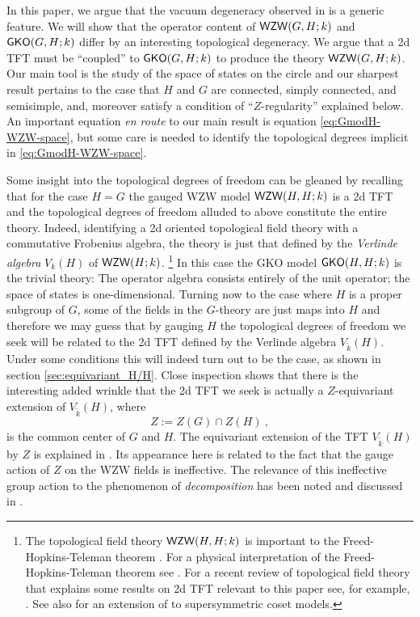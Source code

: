 \documentclass[a4paper,11pt]{article}
\newcommand{\tsf}[1]{\textsf{#1}}
\def\be{ \begin{equation} }
\def\ee{ \end{equation}}
\begin{document}
In this paper, we argue that the vacuum degeneracy observed in \cite{Bardakci:1987ee,Altschuler:1987zb} is a generic feature. We will show that  the operator content of $\mathsf{WZW}(G,H;k)$ and $\mathsf{GKO}(G,H;k)$ differ by an interesting topological degeneracy.
We argue that a 2d \tsf{TFT} must be ``coupled'' to $\mathsf{GKO}(G,H;k)$ to produce 
the theory $\mathsf{WZW}(G,H;k)$. 
Our main tool is the study of the space of states on the circle and our sharpest result pertains to the case that $H$ and $G$ are connected, simply connected, and semisimple, and, moreover 
satisfy a condition of ``$Z$-regularity'' explained below. An important equation
\emph{en route} to our main result is equation \eqref{eq:GmodH-WZW-space}, but some care is needed to identify the topological degrees implicit in \eqref{eq:GmodH-WZW-space}.

Some insight into the topological degrees of freedom can be gleaned by recalling that for the case $H=G$ the gauged \tsf{WZW} model $\mathsf{WZW}(H,H;k)$ is a 2d \tsf{TFT}  \cite{SPIEGELGLAS199036,Spiegelglas:1991uc,Spiegelglas:1992jg,Witten:1991mm,Witten:1993xi} and the topological degrees of freedom alluded to above constitute the entire theory. 
Indeed, identifying a 2d oriented topological field theory with a commutative Frobenius algebra,
the theory is just that defined by the \textit{Verlinde algebra} $V_{k}(H)$ of $\mathsf{WZW}(H;k)$.
%
\footnote{The topological field theory $\mathsf{WZW}(H,H;k)$ is important to the Freed-Hopkins-Teleman theorem \cite{Freed:2003qx,Freed:2007wja,Freed:2009qp}. For a physical interpretation of the Freed-Hopkins-Teleman theorem see 
\cite{Moore:2003vf}. For a recent review of topological field theory that explains some results on 2d \tsf{TFT} relevant to this paper see, for example,   \cite{Moore:2025tmt}. See also \cite{Schafer-Nameki:2003nzb} for an extension of \cite{Freed:2007wja,Moore:2003vf} to supersymmetric coset models.}
%
In this case the \tsf{GKO} model $\mathsf{GKO}(H,H;k)$ is the trivial theory: The operator algebra consists entirely of the unit operator; the space of states is one-dimensional. 
Turning now to the case where $H$ is a proper subgroup of $G$,   some of the fields in the $G$-theory are just maps into $H$ and therefore we may guess that by gauging $H$ the topological degrees of freedom we seek will be related to the 2d \tsf{TFT} defined by the Verlinde algebra $V_{\tilde k}(H)$.  Under some conditions this will indeed turn out to be the case, as shown in section \ref{sec:equivariant_H/H}. Close inspection shows that there is the interesting   added wrinkle that the 2d \tsf{TFT} we seek is actually a $Z$-equivariant extension of  $V_{\tilde k}(H)$, where 
%
\be\label{eq:defZ}
Z :=Z(G)\cap Z(H)~,
\ee
%
is the common center of $G$ and $H$.  The equivariant extension of the \tsf{TFT} $V_{\tilde k}(H)$ by $Z$ is explained in \cite{Moore:2006dw}. Its appearance here is related to the fact that the gauge action of $Z$ on the \tsf{WZW} fields is ineffective. The relevance of this ineffective group action to the phenomenon of \emph{decomposition} has been noted and discussed in \cite{Pantev:2022pbf}.
\end{document}
